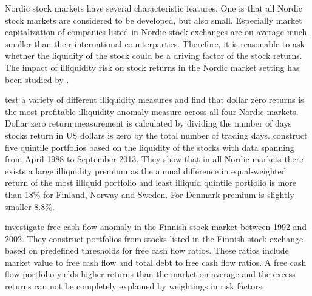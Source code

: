 \documentclass[12pt]{article}
\begin{document}
Nordic stock markets have several characteristic features. One is that all Nordic stock markets are considered to be developed, but also small. Especially market capitalization of companies listed in Nordic stock exchanges are on average much smaller than their international counterparties. Therefore, it is reasonable to ask whether the liquidity of the stock could be a driving factor of the stock returns. The impact of illiquidity risk on stock returns in the Nordic market setting has been studied by \citet{Butt2018}. \par

\citeauthor{Butt2018} test a variety of different illiquidity measures and find that dollar zero returns is the most profitable illiquidity anomaly measure across all four Nordic markets. Dollar zero return measurement is calculated by dividing the number of days stocks return in US dollars is zero by the total number of trading days. \citeauthor{Butt2018} construct five quintile portfolios based on the liquidity of the stocks with data spanning from April 1988 to September 2013. They show that in all Nordic markets there exists a large illiquidity premium as the annual difference in equal-weighted return of the most illiquid portfolio and least illiquid quintile portfolio is more than 18\% for Finland, Norway and Sweden. For Denmark premium is slightly smaller 8.8\%.\footnotemark {} \par

\citet{jokipii2006free} investigate free cash flow anomaly in the Finnish stock market between 1992 and 2002. They construct portfolios from stocks listed in the Finnish stock exchange based on predefined thresholds for free cash flow ratios. These ratios include market value to free cash flow and total debt to free cash flow ratios. A free cash flow portfolio yields higher returns than the market on average and the excess returns can not be completely explained by weightings in \citet{FAMA19933} risk factors.\footnotemark {}  \par
\end{document}

